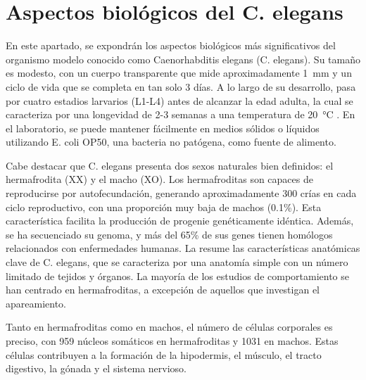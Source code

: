 \section{Aspectos biológicos del C. elegans}

En este apartado, se expondrán los aspectos biológicos más significativos del organismo modelo conocido como Caenorhabditis elegans (C. elegans).  Su tamaño es modesto, con un cuerpo transparente que mide aproximadamente \qty{1}{\milli\metre } y un ciclo de vida que se completa en tan solo 3 días. A lo largo de su desarrollo, pasa por cuatro estadios larvarios (L1-L4) antes de alcanzar la edad adulta, la cual se caracteriza por una longevidad de 2-3 semanas a una temperatura de  \qty{20}{\degreeCelsius} \cite{yue_caenorhabditis_2021}. En el laboratorio, se puede mantener fácilmente en medios sólidos o líquidos utilizando E. coli OP50, una bacteria no patógena, como fuente de alimento.

Cabe destacar que C. elegans presenta dos sexos naturales bien definidos: el hermafrodita (XX) y el macho (XO). Los hermafroditas son capaces de reproducirse por autofecundación, generando aproximadamente 300 crías en cada ciclo reproductivo, con una proporción muy baja de machos (0.1\%). Esta característica facilita la producción de progenie genéticamente idéntica. Además, se ha secuenciado su genoma, y más del 65\% de sus genes tienen homólogos relacionados con enfermedades humanas. La   resume las características anatómicas clave de C. elegans, que se caracteriza por una anatomía simple con un número limitado de tejidos y órganos. La mayoría de los estudios de comportamiento se han centrado en hermafroditas, a excepción de aquellos que investigan el apareamiento.

Tanto en hermafroditas como en machos, el número de células corporales es preciso, con 959 núcleos somáticos en hermafroditas y 1031 en machos. Estas células contribuyen a la formación de la hipodermis, el músculo, el tracto digestivo, la gónada y el sistema nervioso.


